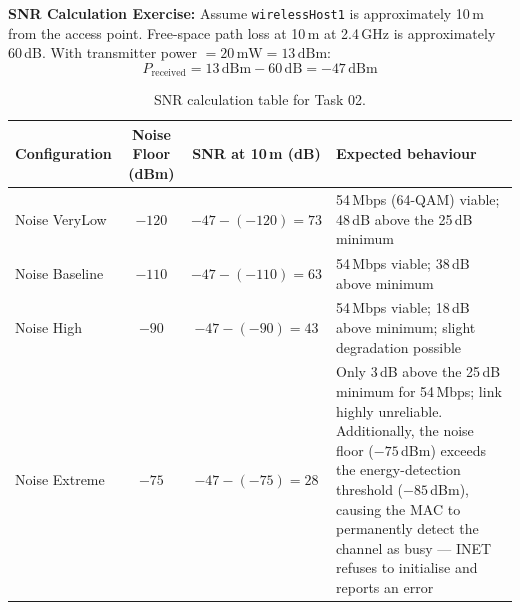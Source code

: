 \documentclass[12pt]{article}
\begin{document}
\textbf{SNR Calculation Exercise:} Assume \texttt{wirelessHost1} is approximately
10\,m from the access point. Free-space path loss at 10\,m at 2.4\,GHz is
approximately 60\,dB. With transmitter power $= 20\,\text{mW} = 13\,\text{dBm}$:
\[
  P_{\text{received}} = 13\,\text{dBm} - 60\,\text{dB} = -47\,\text{dBm}
\]

\begin{table}[H]
    \centering
    \small
    \renewcommand{\arraystretch}{1.15}
    \begin{tabularx}{\linewidth}{|l|c|c|X|}
        \hline
        \textbf{Configuration} & \textbf{Noise Floor (dBm)}
            & \textbf{SNR at 10\,m (dB)} & \textbf{Expected behaviour} \\
        \hline
        Noise VeryLow  & $-120$ & $-47-(-120) = 73$ &
            54\,Mbps (64-QAM) viable; 48\,dB above the 25\,dB minimum \\
        \hline
        Noise Baseline & $-110$ & $-47-(-110) = 63$ &
            54\,Mbps viable; 38\,dB above minimum \\
        \hline
        Noise High     & $-90$  & $-47-(-90)  = 43$ &
            54\,Mbps viable; 18\,dB above minimum; slight degradation
            possible \\
        \hline
        Noise Extreme  & $-75$  & $-47-(-75)  = 28$ &
            Only 3\,dB above the 25\,dB minimum for 54\,Mbps; link highly
            unreliable. Additionally, the noise floor ($-75$\,dBm) exceeds
            the energy-detection threshold ($-85$\,dBm), causing the MAC to
            permanently detect the channel as busy --- INET refuses to
            initialise and reports an error \\
        \hline
    \end{tabularx}
    \caption{SNR calculation table for Task 02.}
    \label{tab:task2_snr}
\end{table}
\end{document}
